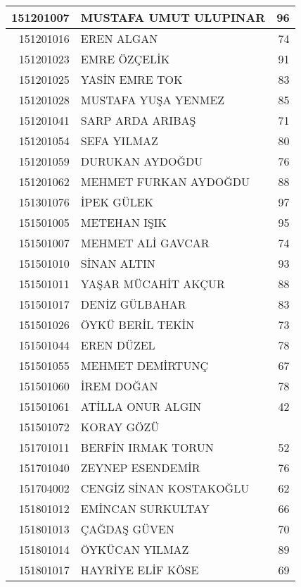 \documentclass[12pt]{article}
\begin{document}
\begin{longtable}{||r||l||r||}
    151201007 & MUSTAFA UMUT ULUPINAR & 96 \\
    \midrule
    151201016 & EREN ALGAN & 74 \\
    \midrule
    151201023 & EMRE ÖZÇELİK & 91 \\
    \midrule
    151201025 & YASİN EMRE TOK & 83 \\
    \midrule
    151201028 & MUSTAFA YUŞA YENMEZ & 85 \\
    \midrule
    151201041 & SARP ARDA ARIBAŞ & 71 \\
    \midrule
    151201054 & SEFA YILMAZ & 80 \\
    \midrule
    151201059 & DURUKAN AYDOĞDU & 76 \\
    \midrule
    151201062 & MEHMET FURKAN AYDOĞDU & 88 \\
    \midrule
    151301076 & İPEK GÜLEK & 97 \\
    \midrule
    151501005 & METEHAN IŞIK & 95 \\
    \midrule
    151501007 & MEHMET ALİ GAVCAR & 74 \\
    \midrule
    151501010 & SİNAN ALTIN & 93 \\
    \midrule
    151501011 & YAŞAR MÜCAHİT AKÇUR & 88 \\
    \midrule
    151501017 & DENİZ GÜLBAHAR & 83 \\
    \midrule
    151501026 & ÖYKÜ BERİL TEKİN & 73 \\
    \midrule
    151501044 & EREN DÜZEL & 78 \\
    \midrule
    151501055 & MEHMET DEMİRTUNÇ & 67 \\
    \midrule
    151501060 & İREM DOĞAN & 78 \\
    \midrule
    151501061 & ATİLLA ONUR ALGIN & 42 \\
    \midrule
    151501072 & KORAY GÖZÜ &  \\
    \midrule
    151701011 & BERFİN IRMAK TORUN & 52 \\
    \midrule
    151701040 & ZEYNEP ESENDEMİR & 76 \\
    \midrule
    151704002 & CENGİZ SİNAN KOSTAKOĞLU & 62 \\
    \midrule
    151801012 & EMİNCAN SURKULTAY & 66 \\
    \midrule
    151801013 & ÇAĞDAŞ GÜVEN & \cellcolor[rgb]{ 1,  1,  0} 70 \\
    \midrule
    151801014 & ÖYKÜCAN YILMAZ & \cellcolor[rgb]{ 1,  1,  0} 89 \\
    \midrule
    151801017 & HAYRİYE ELİF KÖSE & 69 \\

\end{longtable}
\end{document}
